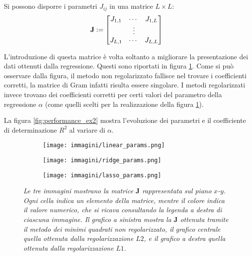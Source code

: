 \documentclass{article}
\begin{document}
Si possono disporre i parametri $J_{ij}$ in una matrice $L \times L$:
\[
\textbf{J}  := \begin{bmatrix}
    J_{1,1} & \cdots & J_{1,L} \\
     \multicolumn{3}{c}{$\vdots$} \\
    J_{L,1} & \cdots & J_{L,L} \\
\end{bmatrix}
\]

L'introduzione di questa matrice è volta soltanto a migliorare la presentazione dei dati ottenuti dalla regressione.
Questi sono riportati in figura \ref{fig:parametri_es2}. Come si può osservare dalla figura, il metodo non regolarizzato fallisce
nel trovare i coefficienti corretti, la matrice di Gram infatti risulta essere singolare.
I metodi regolarizzati invece trovano dei coefficienti corretti per certi valori del parametro della regressione $\alpha$ (come quelli scelti per la realizzazione della figura \ref{fig:parametri_es2}).

La figura \ref{fig:performance_ex2} mostra l'evoluzione dei parametri e il coefficiente di determinazione $R^2$ al variare di $\alpha$.
\begin{figure}[H]
    \centering
    \begin{subfigure}{.30\textwidth}
       \centering
       \texttt{[image: immagini/linear\_params.png]}
    \end{subfigure}
    \begin{subfigure}{.30\textwidth}
       \centering
       \texttt{[image: immagini/ridge\_params.png]}
   \end{subfigure} 
   \begin{subfigure}{.30\textwidth}
    \centering
    \texttt{[image: immagini/lasso\_params.png]}
    \end{subfigure} 
   \caption{\emph{Le tre immagini mostrano la matrice $\textbf{J}$ rappresentata sul piano $x$-$y$. Ogni cella indica un elemento della matrice, mentre il colore indica il valore numerico, che si ricava consultando la legenda a destra di ciascuna immagine. Il grafico a sinistra mostra la $\textbf{J}$ ottenuta tramite il metodo dei minimi quadrati non regolarizzato, il grafico centrale quella ottenuta dalla regolarizzazione $L2$, e il grafico a destra quella ottenuta dalla regolarizzazione $L1$.}}
   \label{fig:parametri_es2}
\end{figure}
\end{document}
